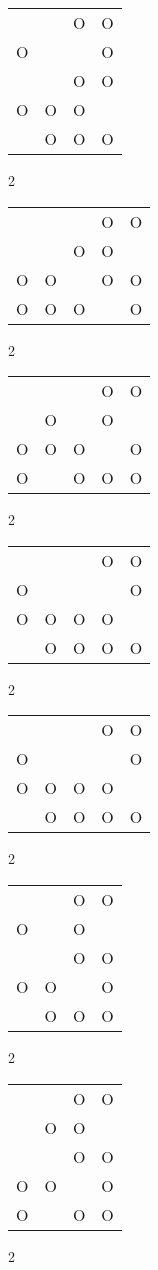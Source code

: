 \begin{tabular}{|m{0.2cm}m{0.2cm}m{0.2cm}m{0.2cm}|}\hline
 & &O&O\\
O& & &O\\
 & &O&O\\
O&O&O& \\
 &O&O&O\\
\hline\end{tabular}2
\begin{tabular}{|m{0.2cm}m{0.2cm}m{0.2cm}m{0.2cm}m{0.2cm}|}\hline
 & & &O&O\\
 & &O&O& \\
O&O& &O&O\\
O&O&O& &O\\
\hline\end{tabular}2
\begin{tabular}{|m{0.2cm}m{0.2cm}m{0.2cm}m{0.2cm}m{0.2cm}|}\hline
 & & &O&O\\
 &O& &O& \\
O&O&O& &O\\
O& &O&O&O\\
\hline\end{tabular}2
\begin{tabular}{|m{0.2cm}m{0.2cm}m{0.2cm}m{0.2cm}m{0.2cm}|}\hline
 & & &O&O\\
O& & & &O\\
O&O&O&O& \\
 &O&O&O&O\\
\hline\end{tabular}2
\begin{tabular}{|m{0.2cm}m{0.2cm}m{0.2cm}m{0.2cm}m{0.2cm}|}\hline
 & & &O&O\\
O& & & &O\\
O&O&O&O& \\
 &O&O&O&O\\
\hline\end{tabular}2
\begin{tabular}{|m{0.2cm}m{0.2cm}m{0.2cm}m{0.2cm}|}\hline
 & &O&O\\
O& &O& \\
 & &O&O\\
O&O& &O\\
 &O&O&O\\
\hline\end{tabular}2
\begin{tabular}{|m{0.2cm}m{0.2cm}m{0.2cm}m{0.2cm}|}\hline
 & &O&O\\
 &O&O& \\
 & &O&O\\
O&O& &O\\
O& &O&O\\
\hline\end{tabular}2
